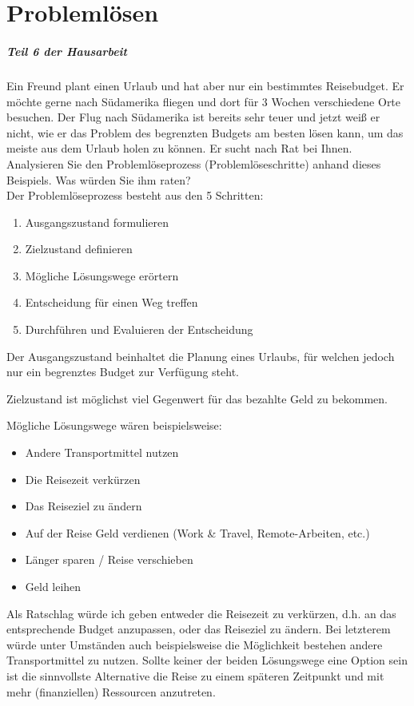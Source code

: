 %
\chapter{Problemlösen}
\label{sec:problemloesen}

\paragraph{Teil 6 der Hausarbeit}
Ein Freund plant einen Urlaub und hat aber nur ein bestimmtes Reisebudget. Er möchte gerne nach Südamerika fliegen und dort für 3 Wochen verschiedene Orte besuchen. Der Flug nach Südamerika ist bereits sehr teuer und jetzt weiß er nicht, wie er das Problem des begrenzten Budgets am besten lösen kann, um das meiste aus dem Urlaub holen zu können. Er sucht nach Rat bei Ihnen. Analysieren Sie den Problemlöseprozess (Problemlöseschritte) anhand dieses Beispiels. Was würden Sie ihm raten? \\[0.4em]

Der Problemlöseprozess besteht aus den 5 Schritten:

\begin{enumerate}
    \item Ausgangszustand formulieren
    \item Zielzustand definieren
    \item Mögliche Lösungswege erörtern
    \item Entscheidung für einen Weg treffen
    \item Durchführen und Evaluieren der Entscheidung
\end{enumerate}

Der Ausgangszustand beinhaltet die Planung eines Urlaubs, für welchen jedoch nur ein begrenztes Budget zur Verfügung steht.

Zielzustand ist möglichst viel Gegenwert für das bezahlte Geld zu bekommen.

Mögliche Lösungswege wären beispielsweise:

\begin{itemize}
    \item Andere Transportmittel nutzen
    \item Die Reisezeit verkürzen
    \item Das Reiseziel zu ändern
    \item Auf der Reise Geld verdienen (Work \& Travel, Remote-Arbeiten, etc.)
    \item Länger sparen / Reise verschieben
    \item Geld leihen
\end{itemize}

Als Ratschlag würde ich geben entweder die Reisezeit zu verkürzen, d.h. an das entsprechende Budget anzupassen, oder das Reiseziel zu ändern. Bei letzterem würde unter Umständen auch beispielsweise die Möglichkeit bestehen andere Transportmittel zu nutzen.
Sollte keiner der beiden Lösungswege eine Option sein ist die sinnvollste Alternative die Reise zu einem späteren Zeitpunkt und mit mehr (finanziellen) Ressourcen anzutreten.

